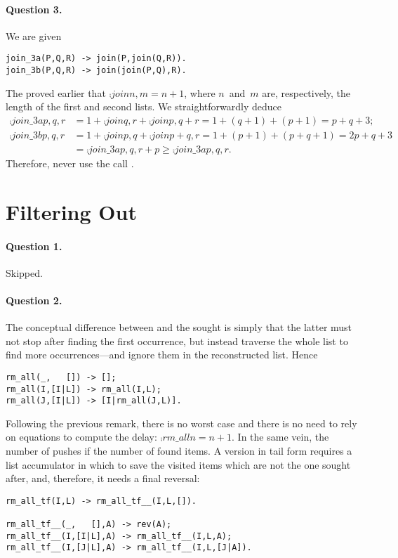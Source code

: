 \paragraph{Question 3.}
We are given
\begin{verbatim}
join_3a(P,Q,R) -> join(P,join(Q,R)).
join_3b(P,Q,R) -> join(join(P,Q),R).
\end{verbatim}
The proved earlier  that
\(\comp{join}{n,m}=n+1\), where \(n\)~and~\(m\) are, respectively, the
length of the first and second lists. We straightforwardly deduce
\begin{align*}
\comp{join\_3a}{p,q,r}
  &= 1 + \comp{join}{q,r} + \comp{join}{p,q+r}
   = 1 + (q+1) + (p+1) = p + q + 3;\\
\comp{join\_3b}{p,q,r}
  &= 1 + \comp{join}{p,q} + \comp{join}{p+q,r}
   = 1 + (p+1) + (p+q+1) = 2p + q + 3\\
  &= \comp{join\_3a}{p,q,r} + p \geqslant \comp{join\_3a}{p,q,r}.
\end{align*}
Therefore, never use the call
.


\section*{Filtering Out}
\label{ans:filtering_out}


\medskip

\paragraph{Question 1.} Skipped.

\medskip

\paragraph{Question 2.}

The conceptual difference between  and the sought
 is simply that the latter must not stop after
finding the first occurrence, but instead traverse the whole list to
find more occurrences---and ignore them in the reconstructed
list. Hence
\begin{verbatim}
rm_all(_,   []) -> [];
rm_all(I,[I|L]) -> rm_all(I,L);
rm_all(J,[I|L]) -> [I|rm_all(J,L)].
\end{verbatim}
Following the previous remark, there is no worst case and there is no
need to rely on equations to compute the delay: \(\comp{rm\_all}{n} =
n+1\). In the same vein, the number of pushes if the number of found
items. A version in tail form requires a list accumulator in which to
save the visited items which are not the one sought after, and,
therefore, it needs a final reversal:
\begin{verbatim}
rm_all_tf(I,L) -> rm_all_tf__(I,L,[]).

rm_all_tf__(_,   [],A) -> rev(A);
rm_all_tf__(I,[I|L],A) -> rm_all_tf__(I,L,A);
rm_all_tf__(I,[J|L],A) -> rm_all_tf__(I,L,[J|A]).
\end{verbatim}

